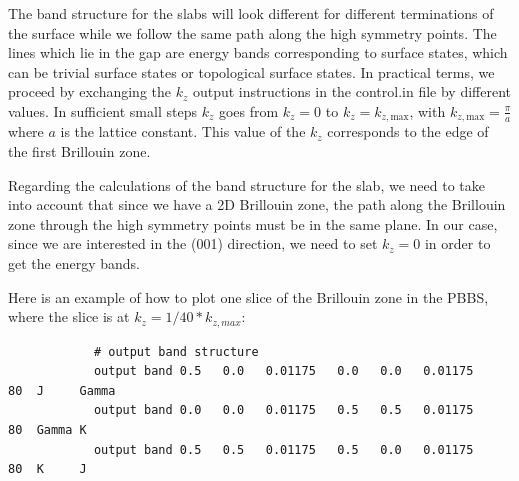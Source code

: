 	The band structure for the slabs will look different for different terminations of the surface while we follow the same path along the high symmetry points.
	The lines which lie in the gap are energy bands corresponding to surface states, which can be trivial surface states or topological surface states. 
	In practical terms, we proceed by exchanging the $k_z$ output instructions in the control.in file by different values. 
	In sufficient small steps $k_z$ goes from $k_z=0$ to $k_z=k_{z,\text{max}}$, with $k_{z,\text{max}} = \frac{\pi}{a}$ where $a$ is the lattice constant. This value of the $k_z$ corresponds to the edge of the first Brillouin zone.
	
	Regarding the calculations of the band structure for the slab, we need to take into account that since we have a 2D Brillouin zone, the path along the Brillouin zone through the high symmetry points must be in the same plane. In our case, since we are interested in the (001) direction, we need to set $k_z = 0$ in order to get the energy bands.
	
	Here is an example of how to plot one slice of the Brillouin zone in the PBBS, where the slice is at $k_z = 1 / 40 * k_{z,max}$:
	\\
	\begin{minipage}[c]{\linewidth}	\vspace{15pt}
		\begin{verbatim}
			# output band structure
			output band 0.5   0.0   0.01175   0.0   0.0   0.01175    80  J     Gamma
			output band 0.0   0.0   0.01175   0.5   0.5   0.01175    80  Gamma K
			output band 0.5   0.5   0.01175   0.5   0.0   0.01175    80  K     J
		\end{verbatim} \vspace{0.2cm}
	\end{minipage}
	
